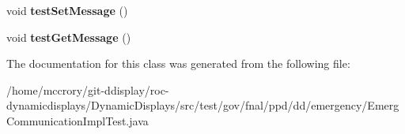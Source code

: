 \begin{DoxyCompactItemize}
\item 
\hypertarget{classtest_1_1gov_1_1fnal_1_1ppd_1_1dd_1_1emergency_1_1EmergCommunicationImplTest_a4f9b92211809ec8387da389f697e1e1f}{void {\bfseries test\-Set\-Message} ()}\label{classtest_1_1gov_1_1fnal_1_1ppd_1_1dd_1_1emergency_1_1EmergCommunicationImplTest_a4f9b92211809ec8387da389f697e1e1f}

\item 
\hypertarget{classtest_1_1gov_1_1fnal_1_1ppd_1_1dd_1_1emergency_1_1EmergCommunicationImplTest_a10f626630b26c221f1c288c12e0b8d37}{void {\bfseries test\-Get\-Message} ()}\label{classtest_1_1gov_1_1fnal_1_1ppd_1_1dd_1_1emergency_1_1EmergCommunicationImplTest_a10f626630b26c221f1c288c12e0b8d37}

\end{DoxyCompactItemize}


The documentation for this class was generated from the following file\-:\begin{DoxyCompactItemize}
\item 
/home/mccrory/git-\/ddisplay/roc-\/dynamicdisplays/\-Dynamic\-Displays/src/test/gov/fnal/ppd/dd/emergency/Emerg\-Communication\-Impl\-Test.\-java\end{DoxyCompactItemize}
